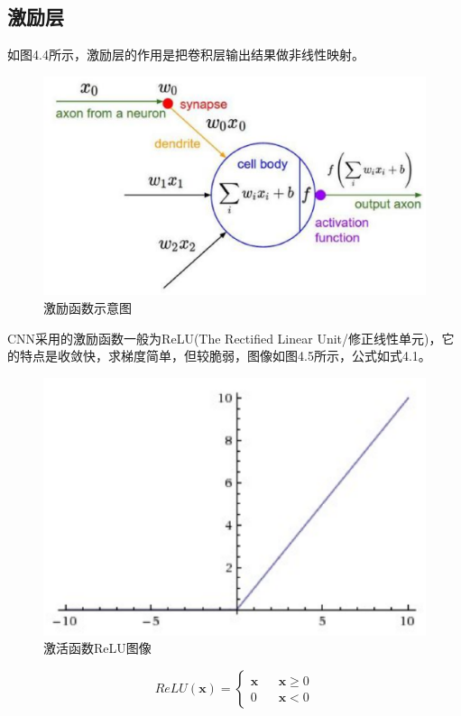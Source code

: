 \documentclass[UTF8, a4paper, 12pt]{report}
\begin{document}
		\subsection{激励层}
			如图4.4所示，激励层的作用是把卷积层输出结果做非线性映射。
			\begin{figure}[!h]
			\centering
			\includegraphics[scale=0.4]{./img/Active.eps}
			\caption{激励函数示意图}
			\label{fig:4.4}
			\end{figure}

			CNN采用的激励函数一般为ReLU(The Rectified Linear Unit/修正线性单元)，它的特点是收敛快，求梯度简单，但较脆弱，图像如图4.5所示，公式如式4.1。
			\begin{figure}[!h]
			\centering
			\includegraphics[scale=0.5]{./img/ReLU.eps}
			\caption{激活函数ReLU图像}
			\label{fig:4.5}
			\end{figure}
			\begin{equation}
			ReLU(\bm{x})=\left\{
			\begin{array}{rcl}
			\bm{x} & & {\bm{x} \geq 0}\\
			0 & & {\bm{x}<0}
			\end{array} \right.
			\end{equation}
\end{document}
